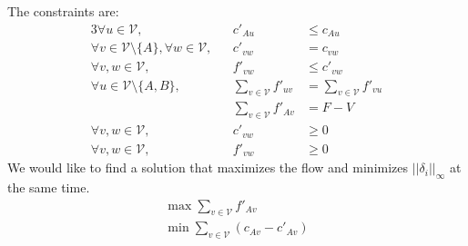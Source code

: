The constraints are:
\begin{alignat*}{3}
  \forall u \in \mathcal{V},&& c'_{Au} &\leq c_{Au} \\
  \forall v \in \mathcal{V} \setminus \{A\}, \forall w \in \mathcal{V},&&  c'_{vw} &= c_{vw} \\
  \forall v,w \in \mathcal{V},&&  f'_{vw} &\leq c'_{vw} \\
  \forall u \in \mathcal{V} \setminus \{A, B\},&& \sum\limits_{v \in \mathcal{V}}f'_{uv} &=
  \sum\limits_{v \in \mathcal{V}}f'_{vu} \\
  &&\sum\limits_{v \in \mathcal{V}}f'_{Av} &= F - V \\
  \forall v,w \in \mathcal{V}, && c'_{vw} &\geq 0 \\
  \forall v,w \in \mathcal{V}, && f'_{vw} &\geq 0
\end{alignat*}
We would like to find a solution that maximizes the flow and minimizes $||\delta_i||_\infty$ at the same time.
\begin{equation*}
\begin{gathered}
  \max{\sum\limits_{v \in \mathcal{V}}f'_{Av}} \\
  \min{\sum\limits_{v \in \mathcal{V}}\left(c_{Av} - c'_{Av}\right)}
\end{gathered}
\end{equation*}
